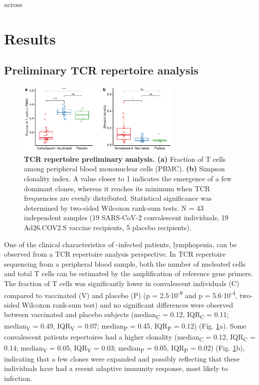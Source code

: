 across\chapter*{Results}
\label{cap:res}

\section*{Preliminary TCR repertoire analysis}


\begin{figure}[t]
	\centering
	\includegraphics[width=0.7\textwidth,keepaspectratio]{figures/fig1.pdf}
	\caption{\textbf{TCR repertoire preliminary analysis. (a)} Fraction of T cells among peripheral blood mononuclear cells (PBMC). \textbf{(b)} Simpson clonality index. A value closer to 1 indicates the emergence of a few dominant clones, whereas it reaches its minimum when TCR frequencies are evenly distributed. Statistical significance was determined by two-sided Wilcoxon rank-sum tests. N = 43 independent samples (19 SARS-CoV-2 convalescent individuals, 19 Ad26.COV2.S vaccine recipients, 5 placebo recipients).}
	\label{fig:lymphopenia}
\end{figure}


One of the clinical characteristics of \covid-infected patients, lymphopenia, can be observed from a TCR repertoire analysis perspective. In TCR repertoire sequencing from a peripheral blood sample, both the number of nucleated cells and total T cells can be estimated by the amplification of reference gene primers. The fraction of T cells was significantly lower in convalescent individuals (C) compared to vaccinated (V) and placebo (P) (p = 2.5$\cdot$10\textsuperscript{-9} and p = 5.6$\cdot$10\textsuperscript{-4}, two-sided Wilcoxon rank-sum test) and no significant differences were observed between vaccinated and placebo subjects (median\textsubscript{C} = 0.12, IQR\textsubscript{C} = 0.11; median\textsubscript{V} = 0.49, IQR\textsubscript{V} = 0.07; median\textsubscript{P} = 0.45, IQR\textsubscript{P} = 0.12) (Fig. \ref{fig:lymphopenia}a). Some convalescent patients \TCRB{} repertoires had a higher clonality (median\textsubscript{C} = 0.12, IQR\textsubscript{C} = 0.14; median\textsubscript{V} = 0.05, IQR\textsubscript{V} = 0.03; median\textsubscript{P} = 0.05, IQR\textsubscript{P} = 0.02) (Fig. \ref{fig:lymphopenia}b), indicating that a few clones were expanded and possibly reflecting that these individuals have had a recent adaptive immunity response, most likely to \covid{} infection.






